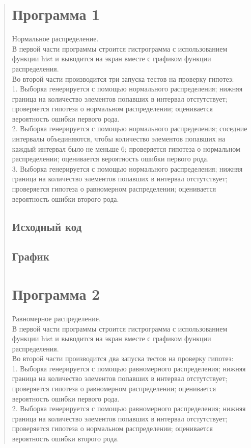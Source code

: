 \documentclass{article}
\begin{document}
\begin{quote}
\section{Программа 1}
	Нормальное распределение. \\
	В первой части программы строится гистрограмма с использованием функции hist и выводится на экран вместе с графиком функции распределения. \\
	Во второй части производится три запуска тестов на проверку гипотез: \\
	1. Выборка генерируется с помощью нормального распределения; нижняя граница на количество элементов попавших в интервал отстутствует; проверяется гипотеза о нормальном распределении; оценивается вероятность ошибки первого рода. \\
	2. Выборка генерируется с помощью нормального распределения; соседние интервалы объединяются, чтобы количество элементов попавших на каждый интервал было не меньше 6; проверяется гипотеза о нормальном распределении; оценивается вероятность ошибки первого рода. \\
	3. Выборка генерируется с помощью нормального распределения; нижняя граница на количество элементов попавших в интервал отстутствует; проверяется гипотеза о равномерном распределении; оценивается вероятность ошибки второго рода. \\
\subsection{Исходный код}
	
\subsection{График}

\section{Программа 2}
	Равномерное распределение. \\
	В первой части программы строится гистрограмма с использованием функции hist и выводится на экран вместе с графиком функции распределения. \\
	Во второй части производится два запуска тестов на проверку гипотез: \\
	1. Выборка генерируется с помощью равномерного распределения; нижняя граница на количество элементов попавших в интервал отстутствует; проверяется гипотеза о равномерном распределении; оценивается вероятность ошибки первого рода. \\
	2. Выборка генерируется с помощью равномерного распределения; нижняя граница на количество элементов попавших в интервал отстутствует; проверяется гипотеза о нормальном распределении; оценивается вероятность ошибки второго рода. \\

\end{quote}
\end{document}
